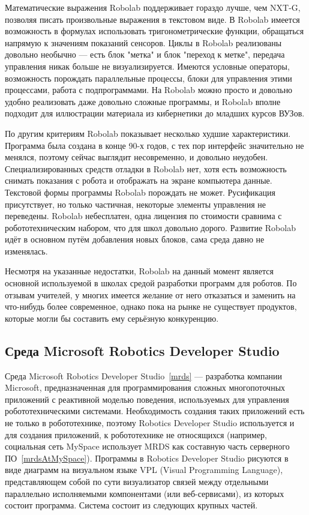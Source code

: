 \documentclass[a4paper]{article}
\begin{document}
Математические выражения Robolab поддерживает гораздо лучше, чем NXT-G, позволяя писать произвольные выражения в текстовом виде. В Robolab имеется возможность в формулах использовать тригонометрические функции, обращаться напрямую к значениям показаний сенсоров. Циклы в Robolab реализованы довольно необычно --- есть блок "метка" и блок "переход к метке", передача управления никак больше не визуализируется. Имеются условные операторы, возможность порождать параллельные процессы, блоки для управления этими процессами, работа с подпрограммами. На Robolab можно просто и довольно удобно реализовать даже довольно сложные программы, и Robolab вполне подходит для иллюстрации материала из кибернетики до младших курсов ВУЗов.

По другим критериям Robolab показывает несколько худшие характеристики. Программа была создана в конце 90-х годов, с тех пор интерфейс значительно не менялся, поэтому сейчас выглядит несовременно, и довольно неудобен. Специализированных средств отладки в Robolab нет, хотя есть возможность снимать показания с робота и отображать на экране компьютера данные. Текстовой формы программы Robolab порождать не может. Русификация присутствует, но только частичная, некоторые элементы управления не переведены. Robolab небесплатен, одна лицензия по стоимости сравнима с робототехническим набором, что для школ довольно дорого. Развитие Robolab идёт в основном путём добавления новых блоков, сама среда давно не изменялась.

Несмотря на указанные недостатки, Robolab на данный момент является основной используемой в школах средой разработки программ для роботов. По отзывам учителей, у многих имеется желание от него отказаться и заменить на что-нибудь более современное, однако пока на рынке не существует продуктов, которые могли бы составить ему серьёзную конкуренцию.

\subsection{Среда Microsoft Robotics Developer Studio}
Среда Microsoft Robotics Developer Studio~\ref{mrds} --- разработка компании Microsoft, предназначенная для программирования сложных многопоточных приложений с реактивной моделью поведения, используемых для управления робототехническими системами. Необходимость создания таких приложений есть не только в робототехнике, поэтому Robotics Developer Studio используется и для создания приложений, к робототехнике не относящихся (например, социальная сеть MySpace использует MRDS как составную часть серверного ПО~\ref{mrdsAtMySpace}). Программы в Robotics Developer Studio рисуются в виде диаграмм на визуальном языке VPL (Visual Programming Language), представляющем собой по сути визуализатор связей между отдельными параллельно исполняемыми компонентами (или веб-сервисами), из которых состоит программа. Система состоит из следующих крупных частей.
\end{document}
